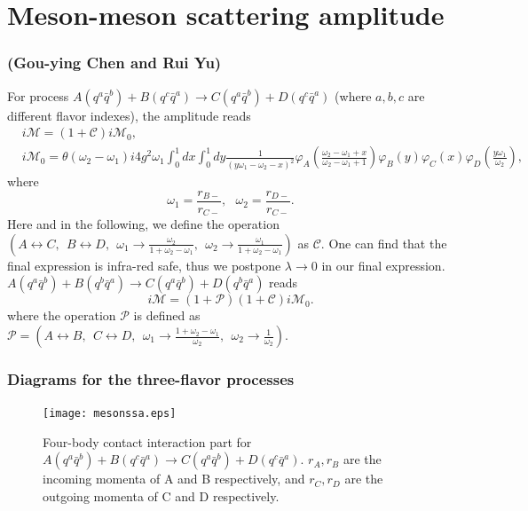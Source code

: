 \documentclass[8pt]{beamer}
\begin{document}
\section{Meson-meson scattering amplitude}
\begin{frame}
	\frametitle{\insertsectionhead (Gou-ying Chen and Rui Yu)}
	For process $A(q^a\bar q^b)+B(q^c\bar q^a)\rightarrow C(q^a\bar
		q^b)+D(q^c\bar q^a)$ (where $a,b,c$ are different flavor indexes), the amplitude reads
	\begin{align*}
		  & i\mathcal{M} =(1+\mathcal{C})i\mathcal{M}_0,\nonumber          \\
		  & i\mathcal{M}_0 =\theta(\omega_2-\omega_1)i4g^2\omega_1\int_0^1
		dx\int_0^1
		dy\frac{1}{(y\omega_1-\omega_2-x)^2}\varphi_A(\frac{\omega_2-\omega_1+x}{\omega_2-\omega_1+1})\varphi_B(y)
		\varphi_C(x)\varphi_D(\frac{y\omega_1}{\omega_2}),\nonumber
	\end{align*}
	where
	\begin{equation}
		\omega_1=\frac{r_{B-}}{r_{C-}},\ \ \ \omega_2=\frac{r_{D-}}{r_{C-}}.
	\end{equation}
	Here and in the following, we define the operation
	$(A\leftrightarrow C,\ \ B\leftrightarrow D,\ \ \omega_1\rightarrow
		\frac{\omega_2}{1+\omega_2-\omega_1},\ \ \omega_2\rightarrow
		\frac{\omega_1}{1+\omega_2-\omega_1})$ as $\mathcal{C}$. One can
	find that the final expression is infra-red safe, thus we postpone
	$\lambda\rightarrow 0$ in our final expression.
	$A(q^a \bar q^b)+B(q^b\bar
		q^a)\rightarrow C(q^a\bar q^b)+D(q^b\bar q^a) $ reads
	\begin{equation}
		i\mathcal{M}=(1+\mathcal{P})(1+\mathcal{C})i\mathcal{M}_{0}.
	\end{equation}
	where the operation $\mathcal{P}$ is defined as
	$\mathcal{P}=(A\leftrightarrow B,\ \ C\leftrightarrow D,\ \
		\omega_1\rightarrow \frac{1+\omega_2-\omega_1}{\omega_2},\ \
		\omega_2\rightarrow \frac{1}{\omega_2})$.
\end{frame}

\begin{frame}
	\frametitle{Diagrams for the three-flavor processes}
	\begin{figure}[hbt]
		\begin{center}
			\texttt{[image: mesonssa.eps]}\\
			\caption{Four-body contact interaction part for $A(q^a\bar
					q^b)+B(q^c\bar q^a)\rightarrow C(q^a\bar q^b)+D(q^c\bar q^a)$.
				$r_A,r_B$ are the incoming momenta of A and B respectively, and
				$r_C,r_D$ are the outgoing momenta of C and D respectively.
			}\label{mesonscatteringa}
		\end{center}
	\end{figure}

\end{frame}
\end{document}
